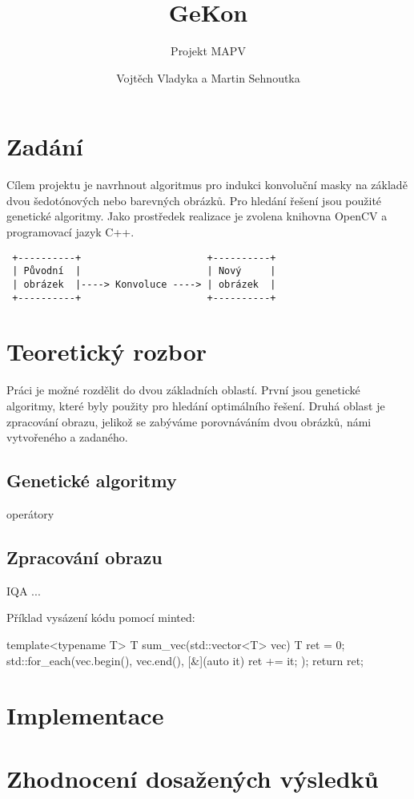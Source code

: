 \documentclass[a4paper,11pt]{scrartcl}
\title{GeKon}
\subtitle{Projekt MAPV}
\author{Vojtěch Vladyka a Martin Sehnoutka}
\begin{document}
\maketitle
\tableofcontents

\section{Zadání}
Cílem projektu je navrhnout algoritmus pro indukci konvoluční masky na základě dvou šedotónových nebo barevných obrázků. Pro hledání řešení jsou použité genetické algoritmy. Jako prostředek realizace je zvolena knihovna OpenCV a programovací jazyk C++.

\begin{verbatim}
 +----------+                      +----------+
 | Původní  |                      | Nový     |
 | obrázek  |----> Konvoluce ----> | obrázek  |
 +----------+                      +----------+
\end{verbatim}

\section{Teoretický rozbor}

Práci je možné rozdělit do dvou základních oblastí. První jsou genetické algoritmy, které byly použity pro hledání optimálního řešení. Druhá oblast je zpracování obrazu, jelikož se zabýváme porovnáváním dvou obrázků, námi vytvořeného a zadaného.

\subsection{Genetické algoritmy}

operátory

\subsection{Zpracování obrazu}

IQA ...

Příklad vysázení kódu pomocí minted:
\begin{cppcode}
template<typename T>
T sum_vec(std::vector<T> vec) {
    T ret = 0;
    std::for_each(vec.begin(), vec.end(), [&](auto it) { ret += it; });
    return ret;
}
\end{cppcode}

\section{Implementace}

\section{Zhodnocení dosažených výsledků}
\end{document}
